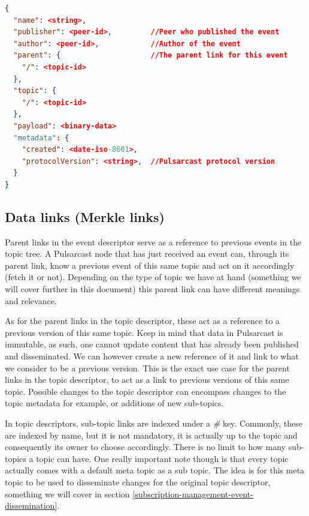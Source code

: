 \begin{lstlisting}[float, language=JSON,caption={Event descriptor schema in a JSON based format},label={event-descriptor}]
{
  "name": <string>,
  "publisher": <peer-id>,         //Peer who published the event
  "author": <peer-id>,            //Author of the event
  "parent": {                     //The parent link for this event
    "/": <topic-id>
  },
  "topic": {
    "/": <topic-id>
  },
  "payload": <binary-data>
  "metadata": {
    "created": <date-iso-8601>,
    "protocolVersion": <string>,  //Pulsarcast protocol version
  }
}
\end{lstlisting}

\subsection{Data links (Merkle links)}\label{subsec:data-links}

Parent links in the event descriptor serve as a reference to previous events in
the topic tree. A Pulsarcast node that has just received an event can, through
its parent link, know a previous event of this same topic and act on it
accordingly (fetch it or not). Depending on the type of topic we have at hand
(something we will cover further in this document) this parent link can have
different meanings and relevance.

As for the parent links in the topic descriptor, these act as a reference to a
previous version of this same topic. Keep in mind that data in Pulsarcast is
immutable, as such, one cannot update content that has already been published
and disseminated. We can however create a new reference of it and link to what
we consider to be a previous version. This is the exact use case for the parent
links in the topic descriptor, to act as a link to previous versions of this
same topic. Possible changes to the topic descriptor can encompass changes to
the topic metadata for example, or additions of new sub-topics.

In topic descriptors, sub-topic links are indexed under a \emph{\#} key.
Commonly, these are indexed by name, but it is not mandatory, it is actually up
to the topic and consequently its owner to choose accordingly.  There is no
limit to how many sub-topics a topic can have. One really important note though is that every topic actually comes with a default meta topic as a sub topic. The idea is for this meta topic to be used to disseminate changes for the original topic descriptor, something we will cover in section \ref{subscription-management-event-dissemination}.

